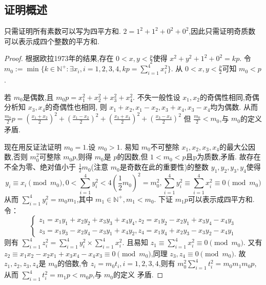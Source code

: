 \documentclass[main]{subfiles}
\begin{document}
\subsection{证明概述}
只需证明所有素数可以写为四平方和.
 \(2=1^2 + 1^2 + 0^2 + 0^2\),因此只需证明奇质数可以表示成四个整数的平方和.
\begin{proof}
	根据欧拉1973年的结果,存在 \(0<x,y<\frac{p}{2} \)使得 \(x^2 + y^2 + 1^2 + 0^2=kp\).
	令 \(m_0:=\min\{k \in \mathbb{N}^+:\exists x_i,i=1,2,3,4,kp=\sum_{i=1}^{4}x_i^2\}\).
	从 \(0<x,y<\frac{p}{2}\)可知 \(m_0 < p\).

	若 \(m_0\)是偶数,且 \(m_0 p = x_1^2 + x_2^2 + x_3^2 + x_4^2\).
	不失一般性设 \(x_1,x_2\)的奇偶性相同,奇偶分析知 \(x_3,x_4\)的奇偶性也相同,
	则 \(x_1+x_2,x_1-x_2,x_3+x_4,x_3-x_4\)均为偶数.
	从而 \(\frac{m_0}{2}p = \left(\frac{x_1+x_2}{2}\right)^2 + \left(\frac{x_1-x_2}{2}\right)^2 + \left(\frac{x_3+x_4}{2}\right)^2 + \left(\frac{x_3-x_4}{2}\right)^2\)
	但 \(\frac{m_0}{2} < m_0\),与 \(m_0\)的定义矛盾.

	现在用反证法证明 \(m_0 = 1\).设 \(m_0 > 1\).
	易知 \(m_0\)不可整除 \(x_1,x_2,x_3,x_4\)的最大公因数,否则 \(m_0^2\)可整除 \(m_0 p\),则得 \(m_0\)是 \(p\)的因数,但 \(1 < m_0 < p\)且p为质数,矛盾.
	故存在不全为零、绝对值小于 \(\frac{1}{2} m_0\)(注意 \(m_0\)是奇数在此的重要性)的整数 \(y_1,y_2,y_3,y_4\)使得
	\[
		y_i \equiv x_i \pmod{m_0},0 < \sum_{i=1}^{4} y_i^2 < 4 (\frac{1}{2} m_0 )^2 = m_0^2 ,\sum_{i=1}^{4} y_i^2 \equiv \sum_{i=1}^{4} x_i^2 \equiv 0 \pmod{m_0}
	\]
	从而 \(\sum_{i=1}^{4} y_i^2  = m_0 m_1\),其中 \(m_1 \in \mathbb{N}^+,m_1 < m_0\).
	下证 \(m_1 p\)可以表示成四平方和.
	令：
	\[
		\begin{cases}
			z_1=x_1 y_1 + x_2 y_2 + x_3 y_3 + x_4 y_4,z_2 = x_1 y_2 - x_2 y_1 + x_3 y_4 - x_4 y_3 \\
			z_3 = x_1 y_3 - x_2 y_4 -x_3 y_1 + x_4 y_2,z_4 = x_1 y_4 + x_2 y_3 -x_3 y_2 -x_4 y_1
		\end{cases}
	\]
	则有 \(\sum_{i=1}^{4} z_i^2 = \sum_{i=1}^{4} y_i^2 \times \sum_{i=1}^{4} x_i^2\).
	且易知 \(z_1 \equiv \sum_{i=1}^{4}x_i^2 \equiv 0 \pmod{m_0}\).
	又有 \(z_2 \equiv x_1 x_2 - x_2 x_1 +x_3 x_4 - x_4 x_3 \equiv 0 \pmod{m_0}\),同理 \(z_3,z_4 \equiv 0 \pmod{m_0}\).
	故 \(z_1,z_2,z_3,z_4\)是 \(m_0\)的倍数,令 \(z_i = m_0 t_i,i=1,2,3,4\),则有
	 \(m_0^2 \sum_{i=1}^{4} t_i^2 = m_0 m_1 m_0 p\),从而
	 \(\sum_{i=1}^{4} t_i^2 = m_1 p < m_0 p\),与 \(m_0\)的定义
	矛盾.
\end{proof}
\end{document}

